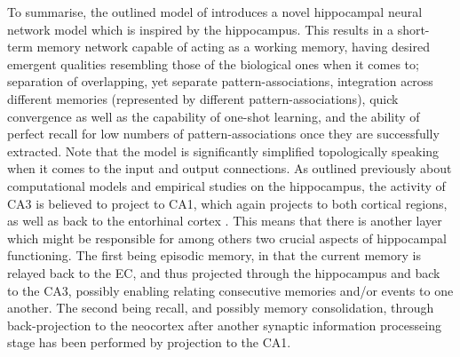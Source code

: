 
To summarise, the outlined model of \cite{Hattori2014} introduces a novel hippocampal neural network model which is inspired by the hippocampus. This results in a short-term memory network capable of acting as a working memory, having desired emergent qualities resembling those of the biological ones when it comes to; separation of overlapping, yet separate pattern-associations, integration across different memories (represented by different pattern-associations), quick convergence as well as the capability of one-shot learning, and the ability of perfect recall for low numbers of pattern-associations once they are successfully extracted.
Note that the model is significantly simplified topologically speaking when it comes to the input and output connections. As outlined previously about computational models and empirical studies on the hippocampus, the activity of CA3 is believed to project to CA1, which again projects to both cortical regions, as well as back to the entorhinal cortex \citep{Rolls1998chpt6}. This means that there is another layer which might be responsible for among others two crucial aspects of hippocampal functioning. The first being episodic memory, in that the current memory is relayed back to the EC, and thus projected through the hippocampus and back to the CA3, possibly enabling relating consecutive memories and/or events to one another. The second being recall, and possibly memory consolidation, through back-projection to the neocortex after another synaptic information processeing stage has been performed by projection to the CA1.
